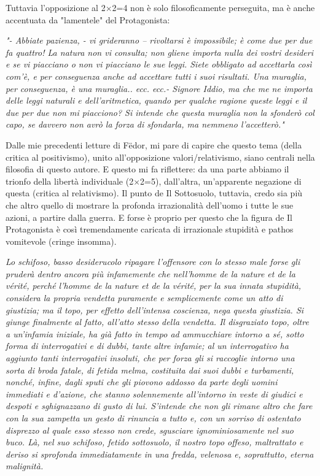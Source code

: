 \documentclass[12pt,a4paper]{report}
\theoremstyle{definition}
\theoremstyle{Theorem}
\theoremstyle{definition}
\theoremstyle{definition}
\theoremstyle{definition}
\begin{document}
Tuttavia l'opposizione al 2$\times$2=4 non è solo filosoficamente perseguita, ma è anche accentuata da "lamentele" del Protagonista: \\
\begin{center}
\textit{
	"- Abbiate pazienza, - vi grideranno – rivoltarsi è impossibile; è come due per due fa quattro! La natura non vi consulta; non gliene importa nulla dei vostri desideri e se vi piacciano o non vi piacciano le sue leggi. Siete obbligato ad accettarla così com'è, e per conseguenza anche ad accettare tutti i suoi risultati. Una muraglia, per conseguenza, è una muraglia.. ecc. ecc.-
	Signore Iddio, ma
	che me ne importa delle leggi naturali e dell’aritmetica, quando per qualche
	ragione queste leggi e il due per due non mi piacciono? Si intende che questa
	muraglia non la sfonderò col capo, se davvero non avrò la forza di sfondarla,
	ma nemmeno l’accetterò."
}
\end{center}
Dalle mie precedenti letture di Fëdor, mi pare di capire che questo tema (della critica al positivismo), unito all'opposizione valori/relativismo, siano centrali nella filosofia di questo autore. E questo mi fa riflettere: da una parte abbiamo il trionfo della libertà individuale (2$\times$2=5), dall'altra, un'apparente negazione di questa (critica al relativismo). Il punto de Il Sottosuolo, tuttavia, credo sia più che altro quello di mostrare la profonda irrazionalità dell'uomo i tutte le sue azioni, a partire dalla guerra. E forse è proprio per questo che la figura de Il Protagonista è così tremendamente caricata di irrazionale stupidità e pathos vomitevole (cringe insomma). 
\begin{center}
	\textit{ Lo schifoso, basso desiderucolo ripagare l'offensore con lo stesso male forse gli pruderà dentro ancora più infamemente che nell'homme de la nature et de la vérité, perché l'homme de la nature et de la vérité, per la sua innata stupidità, considera la propria vendetta puramente e semplicemente come un atto di giustizia; ma il topo, per effetto dell'intensa coscienza, nega questa giustizia. Si giunge finalmente al fatto, all'atto stesso della vendetta. Il disgraziato topo, oltre a un'infamia iniziale, ha già fatto in tempo ad ammucchiare intorno a sé, sotto forma di interrogativi e di dubbi, tante altre infamie; al un interrogativo ha aggiunto tanti interrogativi insoluti, che per forza gli si raccoglie intorno una sorta di broda fatale, di fetida melma,
		costituita dai suoi dubbi e turbamenti, nonché, infine, dagli sputi che gli piovono addosso
		da parte degli uomini immediati e d'azione, che stanno solennemente all'intorno in veste di giudici e despoti e sghignazzano di gusto di lui. S'intende che non gli rimane altro che fare con la sua zampetta un gesto di rinuncia a tutto e, con un sorriso di ostentato disprezzo al quale esso stesso non crede, sgusciare ignominiosamente nel suo buco. Là, nel suo schifoso,
		fetido sottosuolo, il nostro topo offeso, maltrattato e deriso si sprofonda immediatamente in una fredda, velenosa e, soprattutto, eterna malignità.}
\end{center}
\end{document}
